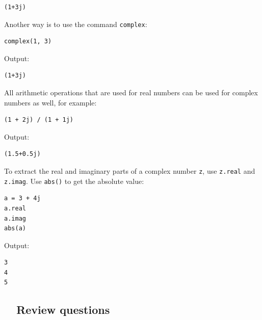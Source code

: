 \begin{verbatim}
(1+3j)
\end{verbatim}
Another way is to use the command {\tt complex}:

\begin{verbatim}
complex(1, 3)
\end{verbatim}
Output:

\begin{verbatim}
(1+3j)
\end{verbatim}
All arithmetic operations that are used for real numbers can be 
used for complex numbers as well, for example:

\begin{verbatim}
(1 + 2j) / (1 + 1j)
\end{verbatim}
Output:

\begin{verbatim}
(1.5+0.5j)
\end{verbatim}
To extract the real and imaginary parts of a complex number {\tt z}, use {\tt z.real}
and {\tt z.imag}. Use {\tt abs()} to get the absolute value:

\begin{verbatim}
a = 3 + 4j
a.real
a.imag
abs(a)
\end{verbatim}
Output:

\begin{verbatim}
3
4
5
\end{verbatim}

\subsection{\ \ Review questions}

